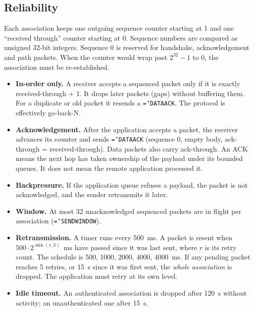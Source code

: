 \documentclass[11pt,a4paper]{article}
\newcommand{\code}[1]{\texttt{\hyphenchar\font=`\-\relax #1}}
\DeclareRobustCommand{\_}{\origunderscore\allowbreak}
\begin{document}
\subsection{Reliability}
Each association keeps one outgoing sequence counter starting at 1 and one ``received
through'' counter starting at 0. Sequence numbers are compared as unsigned 32-bit integers.
Sequence 0 is reserved for handshake, acknowledgement and path packets. When the counter
would wrap past $2^{32}-1$ to 0, the association must be re-established.

\begin{itemize}
\item \textbf{In-order only.} A receiver accepts a sequenced packet only if it is exactly
  received-through + 1. It drops later packets (gaps) without buffering them. For a duplicate
  or old packet it resends a \code{DATA\_ACK}. The protocol is effectively go-back-N.
\item \textbf{Acknowledgement.} After the application accepts a packet, the receiver
  advances its counter and sends \code{DATA\_ACK} (sequence 0, empty body, ack-through =
  received-through). Data packets also carry ack-through. An ACK means the next hop has taken
  ownership of the payload under its bounded queues. It does not mean the remote application
  processed it.
\item \textbf{Backpressure.} If the application queue refuses a payload, the packet is not
  acknowledged, and the sender retransmits it later.
\item \textbf{Window.} At most 32 unacknowledged sequenced packets are in flight per
  association (\code{SEND\_WINDOW}).
\item \textbf{Retransmission.} A timer runs every 500~ms. A packet is resent when
  $500 \cdot 2^{\min(r,3)}$~ms have passed since it was last sent, where $r$ is its retry
  count. The schedule is 500, 1000, 2000, 4000, 4000~ms. If any pending packet reaches 5
  retries, or 15~s since it was first sent, the \emph{whole association} is dropped. The
  application must retry at its own level.
\item \textbf{Idle timeout.} An authenticated association is dropped after 120~s without
  activity; an unauthenticated one after 15~s.
\end{itemize}
\end{document}
